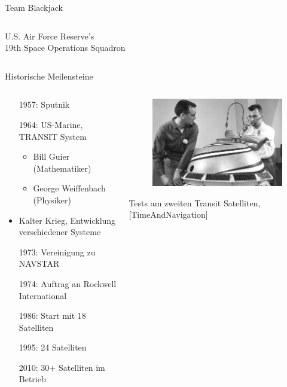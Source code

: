\begin{frame}{Team Blackjack}
\begin{columns}
\begin{column}{0.5\textwidth}
\begin{figure}
            \end{figure}
            U.S. Air Force Reserve's\\
            19th Space Operations Squadron
        \end{column}
    \end{columns}
\end{frame}

\begin{frame}{Historische Meilensteine}
    \begin{columns}
        \begin{column}{0.5\textwidth}
            \begin{itemize}
                \item[1957:] Sputnik
                \item[1964:] US-Marine, TRANSIT System
                \begin{itemize}
                    \item Bill Guier (Mathematiker)
                    \item George Weiffenbach (Physiker)
                \end{itemize}
                \item Kalter Krieg, Entwicklung verschiedener Systeme
                \item[1973:] Vereinigung zu NAVSTAR
                \item[1974:] Auftrag an Rockwell International
                \item[1986:] Start mit 18 Satelliten
                \item[1995:] 24 Satelliten
                \item[2010:] 30+ Satelliten im Betrieb
            \end{itemize}
        \end{column}
        \begin{column}{0.35\textwidth}
            \begin{figure}
                \includegraphics[width=0.35\paperwidth]{images/transit-satellite.jpg}
            \end{figure}
            Tests am zweiten Transit Satelliten, {\small [TimeAndNavigation]}
        \end{column}
    \end{columns}
\end{frame}

